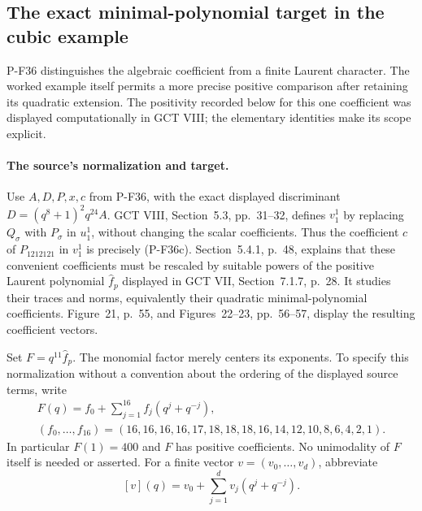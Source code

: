 \subsection{The exact minimal-polynomial target in the cubic example}

P-F36 distinguishes the algebraic coefficient from a finite Laurent
character. The worked example itself permits a more precise positive
comparison after retaining its quadratic extension. The positivity
recorded below for this one coefficient was displayed computationally
in GCT VIII; the elementary identities make its scope explicit.

\paragraph{The source's normalization and target.}
Use $A,D,P,x,c$ from P-F36, with the exact displayed discriminant
$D=(q^8+1)^2q^{24}A$. GCT VIII, Section~5.3, pp.~31--32,
defines $v_1^1$ by replacing $Q_\sigma$ with $P_\sigma$ in
$u_1^1$, without changing the scalar coefficients. Thus the coefficient
$c$ of $P_{1212121}$ in $v_1^1$ is precisely (P-F36c).
Section~5.4.1, p.~48, explains that these convenient coefficients must
be rescaled by suitable powers of the positive Laurent polynomial
$\widehat f_p$ displayed in GCT VII, Section~7.1.7, p.~28.
It studies their traces and norms, equivalently their quadratic
minimal-polynomial coefficients. Figure~21, p.~55, and
Figures~22--23, pp.~56--57, display the resulting coefficient vectors.

Set $F=q^{11}\widehat f_p$. The monomial factor merely centers its
exponents. To specify this normalization without a convention about
the ordering of the displayed source terms, write
\[
 \begin{gathered}
 F(q)=f_0+\sum_{j=1}^{16}f_j(q^j+q^{-j}),\\
 (f_0,\ldots,f_{16})=
 (16,16,16,16,17,18,18,18,16,14,12,10,8,6,4,2,1).
 \end{gathered}
 \tag{P-F39a}
\]
In particular $F(1)=400$ and $F$ has positive coefficients.
No unimodality of $F$ itself is needed or asserted.
For a finite vector $v=(v_0,\ldots,v_d)$, abbreviate
\[
 [v](q)=v_0+\sum_{j=1}^d v_j(q^j+q^{-j}).
\]

